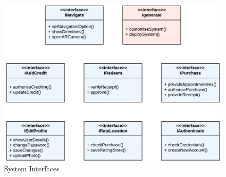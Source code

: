 \begin{figure}[!ht]
\centering
\includegraphics[scale=0.3]{img/System_Interfaces.png}
\caption{System Interfaces}
\label{fig:system_interfaces}
\end{figure}

